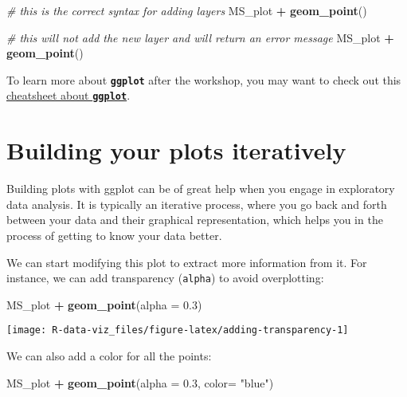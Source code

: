 \documentclass[]{book}
\newenvironment{Shaded}{\begin{snugshade}}{\end{snugshade}}
\newcommand{\CommentTok}[1]{\textcolor[rgb]{0.56,0.35,0.01}{\textit{#1}}}
\newcommand{\DataTypeTok}[1]{\textcolor[rgb]{0.13,0.29,0.53}{#1}}
\newcommand{\FloatTok}[1]{\textcolor[rgb]{0.00,0.00,0.81}{#1}}
\newcommand{\KeywordTok}[1]{\textcolor[rgb]{0.13,0.29,0.53}{\textbf{#1}}}
\newcommand{\NormalTok}[1]{#1}
\newcommand{\OperatorTok}[1]{\textcolor[rgb]{0.81,0.36,0.00}{\textbf{#1}}}
\newcommand{\StringTok}[1]{\textcolor[rgb]{0.31,0.60,0.02}{#1}}
\begin{document}
\begin{Shaded}
\begin{Highlighting}[]
\CommentTok{# this is the correct syntax for adding layers}
\NormalTok{MS_plot }\OperatorTok{+}
\StringTok{  }\KeywordTok{geom_point}\NormalTok{()}

\CommentTok{# this will not add the new layer and will return an error message}
\NormalTok{MS_plot}
  \OperatorTok{+}\StringTok{ }\KeywordTok{geom_point}\NormalTok{()}
\end{Highlighting}
\end{Shaded}

To learn more about \textbf{\texttt{ggplot}} after the workshop, you may want to check out this \href{https://www.rstudio.com/wp-content/uploads/2016/11/ggplot2-cheatsheet-2.1.pdf}{cheatsheet about \textbf{\texttt{ggplot}}}.

\hypertarget{building-your-plots-iteratively}{%
\section{Building your plots iteratively}\label{building-your-plots-iteratively}}

Building plots with ggplot can be of great help when you engage in exploratory data analysis. It is typically an iterative process, where you go back and forth between your data and their graphical representation, which helps you in the process of getting to know your data better.

We can start modifying this plot to extract more information from it. For instance, we can add transparency (\texttt{alpha}) to avoid overplotting:

\begin{Shaded}
\begin{Highlighting}[]
\NormalTok{MS_plot }\OperatorTok{+}\StringTok{ }
\StringTok{  }\KeywordTok{geom_point}\NormalTok{(}\DataTypeTok{alpha =} \FloatTok{0.3}\NormalTok{)}
\end{Highlighting}
\end{Shaded}

\texttt{[image: R-data-viz\_files/figure-latex/adding-transparency-1]}

We can also add a color for all the points:

\begin{Shaded}
\begin{Highlighting}[]
\NormalTok{MS_plot }\OperatorTok{+}\StringTok{  }
\StringTok{  }\KeywordTok{geom_point}\NormalTok{(}\DataTypeTok{alpha =} \FloatTok{0.3}\NormalTok{, }\DataTypeTok{color=} \StringTok{"blue"}\NormalTok{)}
\end{Highlighting}
\end{Shaded}
\end{document}
